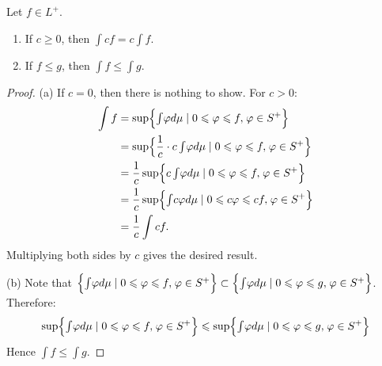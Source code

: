 \begin{proposition}
    Let $f \in L^+$.
    \begin{enumerate}[label = (\arabic*),itemsep=1pt,topsep=3pt]
        \item If $c \geq 0$, then $\int cf = c \int f$.
        \item If $f \leq g$, then $\int f \leq \int g$.
    \end{enumerate}
\end{proposition}
    \begin{proof}
        (a) If $c = 0$, then there is nothing to show. For $c > 0$:
            \begin{equation*}
            \begin{split}
                \int f  
                & = \sup\Bigl\{ {\ts \int} \varphi d\mu \mid 0 \leq \varphi \leq f, \h1 \varphi \in S^+ \Bigr\} \\
                & = \sup \Bigl\{ {\frac{1}{c}\cdot c\ts \int} \varphi d\mu \mid 0 \leq \varphi \leq f, \h1 \varphi \in S^+ \Bigr\} \\
                & = \frac{1}{c}\sup \Bigl\{ {\ts c\int} \varphi d\mu \mid 0 \leq \varphi \leq f, \h1 \varphi \in S^+ \Bigr\} \\
                & = \frac{1}{c}\sup \Bigl\{ {\ts \int} c\varphi d\mu \mid 0 \leq c\varphi \leq cf, \h1 \varphi \in S^+ \Bigr\} \\
                & = \frac{1}{c}\int cf.
            \end{split}
            \end{equation*}
        Multiplying both sides by $c$ gives the desired result.

        (b) Note that $\Bigl\{ {\ts \int} \varphi d\mu \mid 0 \leq \varphi \leq f, \h1 \varphi \in S^+ \Bigr\} \subset \Bigl\{ {\ts \int} \varphi d\mu \mid 0 \leq \varphi \leq g, \h1 \varphi \in S^+ \Bigr\}$. Therefore:
            \begin{equation*}
            \begin{split}
                \sup\Bigl\{ {\ts \int} \varphi d\mu \mid 0 \leq \varphi \leq f, \h1 \varphi \in S^+ \Bigr\} \leq \sup\Bigl\{ {\ts \int} \varphi d\mu \mid 0 \leq \varphi \leq g, \h1 \varphi \in S^+ \Bigr\}
            \end{split}
            \end{equation*}
        Hence $\int f \leq \int g$.
    \end{proof}

